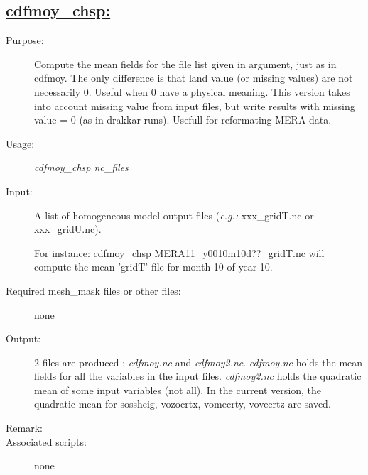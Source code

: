 \documentclass[a4paper,11pt]{article}
\begin{document}
\subsection*{\underline{cdfmoy\_chsp:}}
\begin{description}
\item[Purpose:] Compute the mean fields for the file list given in argument, just as in cdfmoy. The only difference
is that land value (or missing values) are not necessarily 0. Useful when 0 have a physical meaning. This version takes into account 
missing value from input files, but write results with missing value = 0 (as in drakkar runs). Usefull for reformating MERA data.
\item[Usage:] {\em cdfmoy\_chsp nc\_files }
\item[Input:] A list of homogeneous model output files ({\em e.g.: } xxx\_gridT.nc or xxx\_gridU.nc). \

For instance: cdfmoy\_chsp MERA11\_y0010m10d??\_gridT.nc will compute the mean 'gridT' file for month 10 of year 10.
\item[Required mesh\_mask files or other files:]  none
\item[Output:] 2 files are produced : {\em cdfmoy.nc} and {\em cdfmoy2.nc}. {\em cdfmoy.nc} holds the mean fields
for all the variables in the input files. {\em cdfmoy2.nc} holds the quadratic mean of some input variables (not all). 
In the current version, the quadratic mean for sossheig, vozocrtx, vomecrty, vovecrtz are saved.
\item[Remark:] 
\item[Associated scripts:] none
\end{description}
\end{document}
